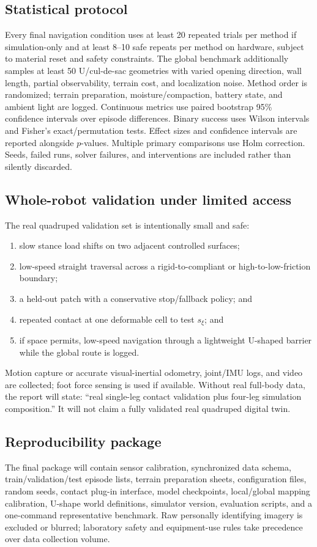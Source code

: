 \subsection{Statistical protocol}

Every final navigation condition uses at least 20 repeated trials per method if simulation-only and at least 8--10 safe repeats per method on hardware, subject to material reset and safety constraints. The global benchmark additionally samples at least 50 U/cul-de-sac geometries with varied opening direction, wall length, partial observability, terrain cost, and localization noise. Method order is randomized; terrain preparation, moisture/compaction, battery state, and ambient light are logged. Continuous metrics use paired bootstrap 95\% confidence intervals over episode differences. Binary success uses Wilson intervals and Fisher's exact/permutation tests. Effect sizes and confidence intervals are reported alongside $p$-values. Multiple primary comparisons use Holm correction. Seeds, failed runs, solver failures, and interventions are included rather than silently discarded.

\subsection{Whole-robot validation under limited access}

The real quadruped validation set is intentionally small and safe:
\begin{enumerate}
  \item slow stance load shifts on two adjacent controlled surfaces;
  \item low-speed straight traversal across a rigid-to-compliant or high-to-low-friction boundary;
  \item a held-out patch with a conservative stop/fallback policy; and
  \item repeated contact at one deformable cell to test $s_\xi$; and
  \item if space permits, low-speed navigation through a lightweight U-shaped barrier while the global route is logged.
\end{enumerate}
Motion capture or accurate visual-inertial odometry, joint/IMU logs, and video are collected; foot force sensing is used if available. Without real full-body data, the report will state: ``real single-leg contact validation plus four-leg simulation composition.'' It will not claim a fully validated real quadruped digital twin.

\subsection{Reproducibility package}

The final package will contain sensor calibration, synchronized data schema, train/validation/test episode lists, terrain preparation sheets, configuration files, random seeds, contact plug-in interface, model checkpoints, local/global mapping calibration, U-shape world definitions, simulator version, evaluation scripts, and a one-command representative benchmark. Raw personally identifying imagery is excluded or blurred; laboratory safety and equipment-use rules take precedence over data collection volume.
